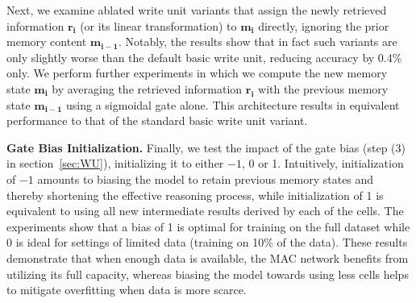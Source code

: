 \documentclass[fleqn]{article}
\newcommand{\secref}[1]{section~\ref{sec:#1}}
\begin{document}
Next, we examine ablated write unit variants that assign the newly retrieved information \(\boldsymbol{r_{i}}\) (or its linear transformation) to \(\boldsymbol{m_{i}}\) directly, ignoring the prior memory content \(\boldsymbol{m_{i-1}}\). Notably, the results show that in fact such variants are only slightly worse than the default basic write unit, reducing accuracy by 0.4\% only. We perform further experiments in which we compute the new memory state \(\boldsymbol{m_{i}}\) by averaging the retrieved information \(\boldsymbol{r_{i}}\) with the previous memory state \(\boldsymbol{m_{i-1}}\) using a sigmoidal gate alone. This architecture results in equivalent performance to that of the standard basic write unit variant.

\textbf{Gate Bias Initialization.} Finally, we test the impact of the gate bias (step (3) in \secref{WU}), initializing it to either $-1$, 0 or 1. Intuitively, initialization of $-1$ amounts to biasing the model to retain previous memory states and thereby shortening  the effective reasoning process, while initialization of 1 is equivalent to using all new intermediate results derived by each of the cells. The experiments show that a bias of 1 is optimal for training on the full dataset while 0 is ideal for settings of limited data (training on 10\% of the data). These results demonstrate that when enough data is available, the MAC network benefits from utilizing its full capacity,  whereas biasing the model towards using less cells helps to mitigate overfitting when data is more scarce. 
\end{document}
